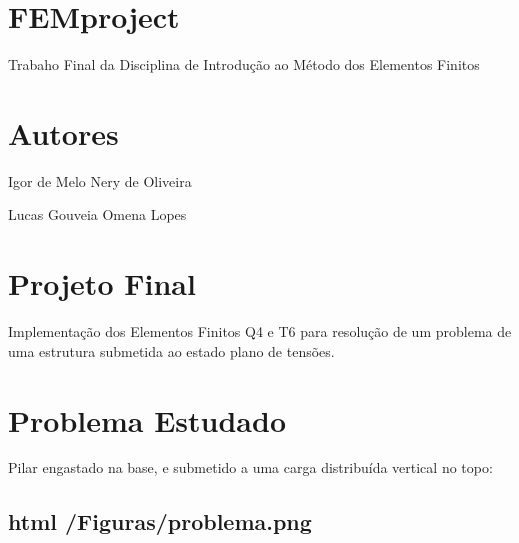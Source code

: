 \section*{F\+E\+Mproject}

Trabaho Final da Disciplina de Introdução ao Método dos Elementos Finitos

\section*{Autores}


\begin{DoxyItemize}
\item Igor de Melo Nery de Oliveira
\item Lucas Gouveia Omena Lopes
\end{DoxyItemize}

\section*{Projeto Final}


\begin{DoxyItemize}
\item Implementação dos Elementos Finitos Q4 e T6 para resolução de um problema de uma estrutura submetida ao estado plano de tensões.
\end{DoxyItemize}

\section*{Problema Estudado}

Pilar engastado na base, e submetido a uma carga distribuída vertical no topo\+:

\subsection*{html /\+Figuras/problema.png}



